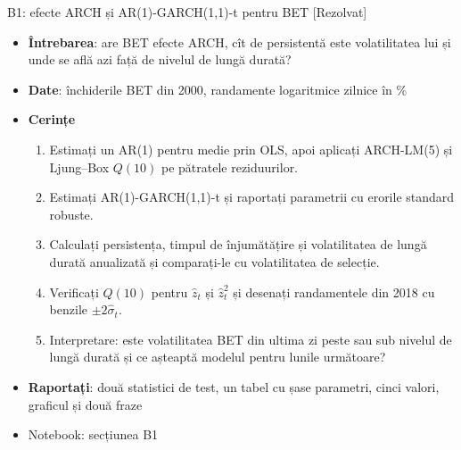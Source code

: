 \begin{frame}{B1: efecte ARCH și AR(1)-GARCH(1,1)-t pentru BET [Rezolvat]}
\itemsize{\footnotesize}
\begin{itemize}
\item \textbf{Întrebarea}: are BET efecte ARCH, cît de persistentă este volatilitatea lui și unde se află azi față de nivelul de lungă durată?
\item \textbf{Date}: închiderile BET din 2000, randamente logaritmice zilnice în \%
\item \textbf{Cerințe}
\begin{enumerate}
    \item Estimați un AR(1) pentru medie prin OLS, apoi aplicați ARCH-LM(5) și Ljung--Box $Q(10)$ pe pătratele reziduurilor.
    \item Estimați AR(1)-GARCH(1,1)-t și raportați parametrii cu erorile standard robuste.
    \item Calculați persistența, timpul de înjumătățire și volatilitatea de lungă durată anualizată și comparați-le cu volatilitatea de selecție.
    \item Verificați $Q(10)$ pentru $\hat z_t$ și $\hat z_t^2$ și desenați randamentele din 2018 cu benzile $\pm 2\hat\sigma_t$.
    \item Interpretare: este volatilitatea BET din ultima zi peste sau sub nivelul de lungă durată și ce așteaptă modelul pentru lunile următoare?
\end{enumerate}
\item \textbf{Raportați}: două statistici de test, un tabel cu șase parametri, cinci valori, graficul și două fraze
\item Notebook: secțiunea B1
\end{itemize}
\end{frame}

